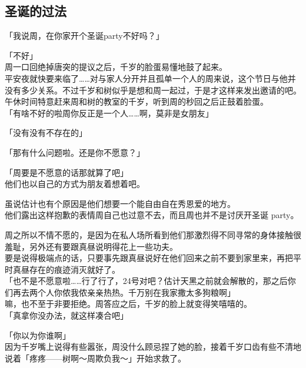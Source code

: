 \subsection{圣诞的过法}

「我说周，在你家开个圣诞party不好吗？」

「不好」\\

周一口回绝掉唐突的提议之后，千岁的脸蛋易懂地鼓了起来。\\

平安夜就快要来临了……对与家人分开并且孤单一个人的周来说，这个节日与他并没有多少关系。不过千岁和树似乎是想和周一起过，于是才这样来发出邀请的吧。\\

午休时间特意赶来周和树的教室的千岁，听到周的秒回之后正鼓着脸蛋。\\

「有啥不好的啦周你反正是一个人……啊，莫非是女朋友」

「没有没有不存在的」

「那有什么问题啦。还是你不愿意？」

「周要是不愿意的话那就算了吧」\\

他们也以自己的方式为朋友着想着吧。

虽说估计也有个原因是他们想要一个能自由自在秀恩爱的地方。\\

他们露出这样抱歉的表情周自己也过意不去，而且周也并不是讨厌开圣诞 party。

周之所以不情不愿的，是因为在私人场所看到他们那激烈得不同寻常的身体接触很羞耻，另外还有要跟真昼说明得花上一些功夫。\\

要是说得极端点的话，只要事先跟真昼说好在他们回来之前不要到家里来，再把平时真昼存在的痕迹消灭就好了。\\

「也不是不愿意啦……行了行了，24号对吧？估计天黑之前就会解散的，那之后你们再去两个人你侬我侬亲亲热热。千万别在我家撒太多狗粮啊」\\

嘛，也不至于非要拒绝。周答应之后，千岁的脸上就变得笑嘻嘻的。\\

「真拿你没办法，就这样凑合吧」

「你以为你谁啊」\\

因为千岁嘴上说得有些嚣张，周没什么顾忌捏了她的脸，接着千岁口齿有些不清地说着「疼疼——树啊～周欺负我～」开始求救了。\\

